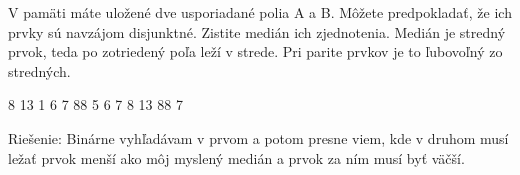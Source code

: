 
V pamäti máte uložené dve usporiadané polia A a B. Môžete
predpokladať, že ich prvky sú navzájom disjunktné. Zistite
medián ich zjednotenia. Medián je stredný prvok, teda po
zotriedený poľa leží v strede. Pri parite prvkov je to
ľubovoľný zo stredných.

 8 13
1 6 7 88
 5 6 7 8 13 88
7
\koniec

Riešenie: Binárne vyhľadávam v prvom a potom presne viem, kde
v druhom musí ležať prvok menší ako môj myslený medián a prvok
za ním musí byť väčší.
